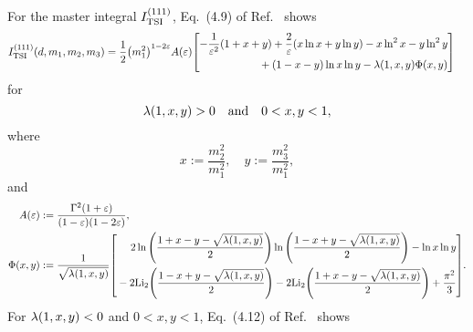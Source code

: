 \documentclass{article}
\begin{document}
            For the master integral $\TSI{111}$, Eq.~(4.9) of Ref.~\cite{Davydychev:1992mt} shows
            \begin{equation}
                \begin{aligned}
                    \TSI{111}[d, m_1, m_2, m_3] & = \frac{1}{2} \qty(m_1^2)^{1 - 2 \varepsilon} A(\varepsilon) \qty[
                        \begin{aligned}
                            -\frac{1}{\varepsilon^2} \qty(1 + x + y) + \frac{2}{\varepsilon} \qty(x \ln x + y \ln y) - x \ln^2 x - y \ln^2 y \\
                            {} + (1 - x - y) \ln x \ln y - \lambdaFun{1, x, y} \Phi(x, y)
                        \end{aligned}
                    ]
                \end{aligned}
                \label{eq:TSI-111}
            \end{equation}
            for
            \begin{equation}
                \lambdaFun{1, x, y} > 0 \qand 0 < x, y < 1,
            \end{equation}
            where
            \begin{equation}
                x := \frac{m_2^2}{m_1^2}, \quad y := \frac{m_3^2}{m_1^2},
            \end{equation}
            and
            \begin{equation}
                \begin{aligned}
                    A(\varepsilon) & := \frac{\Gamma^2(1 + \varepsilon)}{(1 - \varepsilon) (1 - 2 \varepsilon)}, \\
                    \Phi(x, y) & := \frac{1}{\sqrt{\lambdaFun{1, x, y}}} \qty[
                        \begin{aligned}
                            2 \ln\qty(\frac{1 + x - y - \sqrt{\lambdaFun{1, x, y}}}{2}) \ln\qty(\frac{1 - x + y - \sqrt{\lambdaFun{1, x, y}}}{2}) - \ln x \ln y \\
                            {} - 2 \Li[2]{\frac{1 - x + y - \sqrt{\lambdaFun{1, x, y}}}{2}} - 2 \Li[2]{\frac{1 + x - y - \sqrt{\lambdaFun{1, x, y}}}{2}} + \frac{\pi^2}{3}
                        \end{aligned}
                    ].
                \end{aligned}
            \end{equation}
            For $\lambdaFun{1, x, y} < 0$ and $0 < x, y < 1$, Eq.~(4.12) of Ref.~\cite{Davydychev:1992mt} shows
\end{document}
